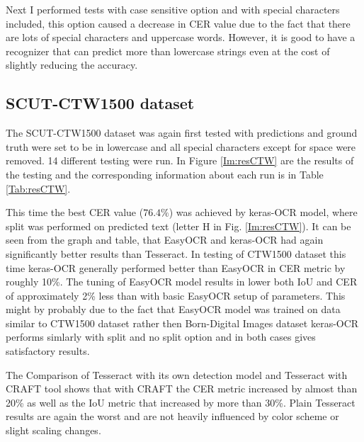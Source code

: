 Next I performed tests with case sensitive option and with special characters included, this option caused a decrease in CER value due to the fact that there are lots of special characters and uppercase words. However, it is good to have a recognizer that can predict more than lowercase strings even at the cost of slightly reducing the accuracy.


\subsection*{SCUT-CTW1500 dataset}
The SCUT-CTW1500 dataset was again first tested with predictions and ground truth were set to be in lowercase and all special characters except for space were removed. 14 different testing were run.  In Figure \ref*{Im:resCTW} are the results of the testing and the corresponding information about each run is in Table \ref*{Tab:resCTW}. 

This time the best CER value ($76.4\%$) was achieved by keras-OCR model, where split was performed on predicted text (letter H in Fig. \ref*{Im:resCTW}). It can be seen from the graph and table, that EasyOCR and keras-OCR had again significantly better results than Tesseract. In testing of CTW1500 dataset this time keras-OCR generally performed better than EasyOCR in CER metric by roughly 10\%. The tuning of EasyOCR model results in lower both IoU and CER of approximately 2\% less than with basic EasyOCR setup of parameters. This might by probably due to the fact that EasyOCR model was trained on data similar to CTW1500 dataset rather then Born-Digital Images dataset keras-OCR performs simlarly with split and no split option and in both cases gives satisfactory results.

The Comparison of Tesseract with its own detection model and Tesseract with CRAFT tool shows that with CRAFT the CER metric increased by almost than 20\% as well as the IoU metric that increased by more than 30\%. Plain Tesseract results are again the worst and are not heavily influenced by color scheme or slight scaling changes. 

